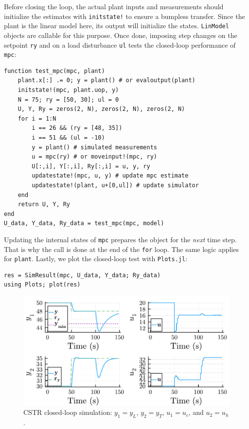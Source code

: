Before closing the loop, the actual plant inputs and measurements should initialize the estimates with \texttt{initstate!} to ensure a bumpless transfer. Since the plant is the linear model here, its output will initialize the states. \texttt{LinModel} objects are callable for this purpose. Once done, imposing step changes on the setpoint \texttt{ry} and on a load disturbance \texttt{ul} tests the closed-loop performance of \texttt{mpc}:
\begin{verbatim}
function test_mpc(mpc, plant)
    plant.x[:] .= 0; y = plant() # or evaloutput(plant)
    initstate!(mpc, plant.uop, y)
    N = 75; ry = [50, 30]; ul = 0
    U, Y, Ry = zeros(2, N), zeros(2, N), zeros(2, N)
    for i = 1:N
        i == 26 && (ry = [48, 35])
        i == 51 && (ul = -10)
        y = plant() # simulated measurements
        u = mpc(ry) # or moveinput!(mpc, ry)
        U[:,i], Y[:,i], Ry[:,i] = u, y, ry
        updatestate!(mpc, u, y) # update mpc estimate
        updatestate!(plant, u+[0,ul]) # update simulator
    end
    return U, Y, Ry
end
U_data, Y_data, Ry_data = test_mpc(mpc, model)
\end{verbatim}
Updating the internal states of \texttt{mpc} prepares the object for the \emph{next} time step. That is why the call is done at the end of the \texttt{for} loop. The same logic applies for \texttt{plant}. Lastly, we plot the closed-loop test with \texttt{Plots.jl}:
\begin{verbatim}
res = SimResult(mpc, U_data, Y_data; Ry_data)
using Plots; plot(res)
\end{verbatim}

\begin{figure}[ht]
    \centering
    \includegraphics[width=\columnwidth]{fig/plot_LinMPC1.pdf}
    \caption{CSTR closed-loop simulation: $y_1=y_L$, $y_2=y_T$, $u_1=u_c$, and $u_2=u_h$.}
    \label{fig:plot_LinMPC1}
\end{figure}

